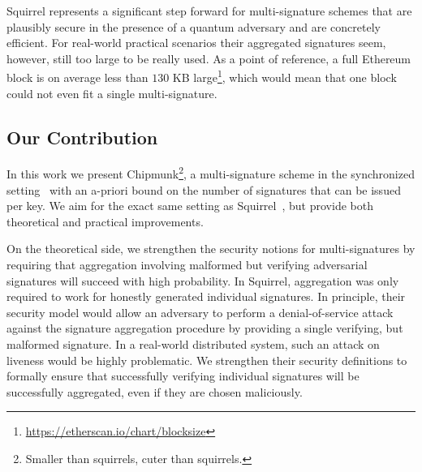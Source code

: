 Squirrel represents a significant step forward for multi-signature schemes that are plausibly secure in the presence of a quantum adversary and are concretely efficient.
For real-world practical scenarios their aggregated signatures seem, however, still too large to be really used.
As a point of reference, a full Ethereum block is on average less than $130$ KB large\footnote{\url{https://etherscan.io/chart/blocksize}}, which would mean that one block could not even fit a single multi-signature.

\subsection{Our Contribution}\label{sec:intro-contrib}
In this work we present Chipmunk\footnote{Smaller than squirrels, cuter than squirrels.}, a multi-signature scheme in the synchronized setting~\cite{PKC:GenRam06,CCS:AhnGreHoh10,EC:HohWat18,USENIX:DGNW20} with an a-priori bound on the number of signatures that can be issued per key. 
We aim for the exact same setting as Squirrel~\cite{CCS:FleSimZha22}, but provide both theoretical and practical improvements.

On the theoretical side, we strengthen the security notions for multi-signatures by requiring that aggregation involving malformed but verifying adversarial signatures will succeed with high probability. 
In Squirrel, aggregation was only required to work for honestly generated individual signatures. 
In principle, their security model would allow an adversary to perform a denial-of-service attack against the signature aggregation procedure by providing a single verifying, but malformed signature.
In a real-world distributed system, such an attack on liveness would be highly problematic.
We strengthen their security definitions to formally ensure that successfully verifying individual signatures will be successfully aggregated, even if they are chosen maliciously. 

